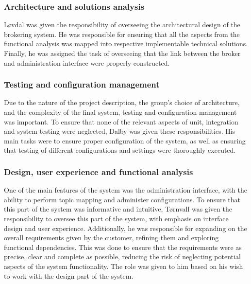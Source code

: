\subsubsection{Architecture and solutions analysis}
\label{subsec:process_and_methodology-project_organization-architecture_and_solutions_analysis}

Løvdal was given the responsibility of overseeing the architectural design of the brokering system. He was responsible for ensuring that all the aspects from the functional analysis was mapped into respective implementable technical solutions. Finally, he was assigned the task of overseeing that the link between the broker and administration interface were properly constructed.

\subsubsection{Testing and configuration management}
\label{subsec:process_and_methodology-project_organization-testing_and_configuration_management}

Due to the nature of the project description, the group's choice of architecture, and the complexity of the final system, testing and configuration management was important. To ensure that none of the relevant aspects of unit, integration and system testing were neglected, Dalby was given these responsibilities. His main tasks were to ensure proper configuration of the system, as well as ensuring that testing of different configurations and settings were thoroughly executed.

\subsubsection{Design, user experience and functional analysis}
\label{subsec:process_and_methodology-project_organization-design_user_experience_and_functional_analysis}

One of the main features of the system was the administration interface, with the ability to perform topic mapping and administer configurations. To ensure that this part of the system was informative and intuitive, Tørnvall was given the responsibility to oversee this part of the system, with emphasis on interface design and user experience. Additionally, he was responsible for expanding on the overall requirements given by the customer, refining them and exploring functional dependencies. This was done to ensure that the requirements were as precise, clear and complete as possible, reducing the risk of neglecting potential aspects of the system functionality. The role was given to him based on his wish to work with the design part of the system.

